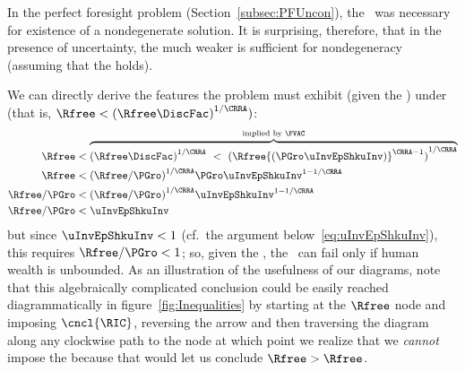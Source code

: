 \documentclass[BufferStockTheory]{subfiles}
\begin{document}
In the perfect foresight problem (Section~\ref{subsec:PFUncon}), the \RIC~was necessary for existence of a nondegenerate solution.  It is surprising, therefore, that in the presence of uncertainty, the much weaker {\WRIC} is sufficient for nondegeneracy (assuming that the {\FVAC} holds).
\begin{comment}
  But if the \RIC~does hold, some useful results can be derived.  Arguably
  the most fundamental are that the limiting values
  for the minimal and maximal marginal propensities to consume implicit in
 ~\eqref{eq:MaxMPCInv} and~\eqref{eq:MinMPCInv} are positive and finite.
\end{comment}
We can directly derive the features the problem must
exhibit (given the \FVAC) under \cncl{\RIC} (that is, $\Rfree < {(\Rfree \DiscFac)}^{1/\CRRA})$:
\begin{align}
  \Rfree   & < \overbrace{{(\Rfree \DiscFac)}^{1/\CRRA} ~ < ~ {(\Rfree {(\PGro \uInvEpShkuInv)}^{\CRRA-1})}^{1/\CRRA}}^{\text{implied by \FVAC}} \notag
  \\  \Rfree   & < {(\Rfree/\PGro)}^{1/\CRRA}\PGro \uInvEpShkuInv^{1-1/\CRRA} \notag
  \\  \Rfree/\PGro  & < {(\Rfree/\PGro)}^{1/\CRRA}\uInvEpShkuInv^{1-1/\CRRA} \notag
  \\  \Rfree/\PGro  & < \uInvEpShkuInv \label{eq:RICimplies}
\end{align}
but since $\uInvEpShkuInv < 1$ (cf.\ the argument below~\eqref{eq:uInvEpShkuInv}), this requires $\Rfree/\PGro < 1$; so, given the \FVAC, the \RIC~can fail only if human wealth is unbounded.  As an illustration of the usefulness of our diagrams, note that this algebraically complicated conclusion could be easily reached diagrammatically in figure~\ref{fig:Inequalities} by starting at the $\Rfree$ node and imposing $\cncl{\RIC}$, reversing the {\RIC} arrow and then traversing the diagram along any clockwise path to the {\PFVAF} node at which point we realize that we \textit{cannot} impose the {\FHWC} because that would let us conclude $\Rfree > \Rfree$.
\end{document}
